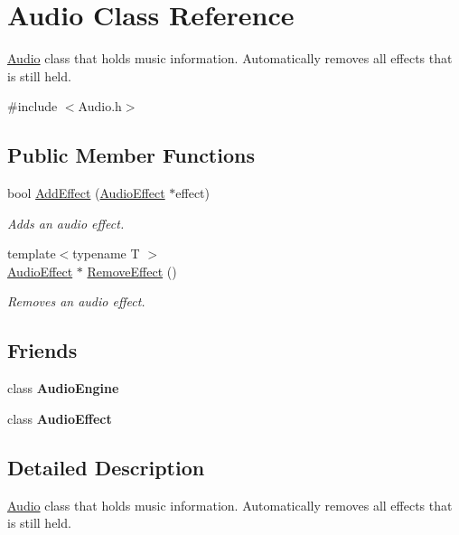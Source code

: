 \hypertarget{class_audio}{}\section{Audio Class Reference}
\label{class_audio}


\hyperlink{class_audio}{Audio} class that holds music information. Automatically removes all effects that is still held.  




{\ttfamily \#include $<$Audio.\+h$>$}

\subsection*{Public Member Functions}
\begin{DoxyCompactItemize}
\item 
bool \hyperlink{class_audio_a1014b0af8df3f0eb3dc1e99e86ad43db}{Add\+Effect} (\hyperlink{class_audio_effect}{Audio\+Effect} $\ast$effect)
\begin{DoxyCompactList}\small\item\em Adds an audio effect. \end{DoxyCompactList}\item 
{\footnotesize template$<$typename T $>$ }\\\hyperlink{class_audio_effect}{Audio\+Effect} $\ast$ \hyperlink{class_audio_a63e37ba7c615699db84188fac87dedc9}{Remove\+Effect} ()
\begin{DoxyCompactList}\small\item\em Removes an audio effect. \end{DoxyCompactList}\end{DoxyCompactItemize}
\subsection*{Friends}
\begin{DoxyCompactItemize}
\item 
\mbox{\label{class_audio_a234a96133b0b1dbaf4181626861f7c4a}} 
class {\bfseries Audio\+Engine}
\item 
\mbox{\label{class_audio_a7e74df8564d626641971702bfa4a0d5e}} 
class {\bfseries Audio\+Effect}
\end{DoxyCompactItemize}


\subsection{Detailed Description}
\hyperlink{class_audio}{Audio} class that holds music information. Automatically removes all effects that is still held. 


